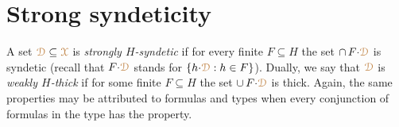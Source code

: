 \begin{comment}

\begin{corollary}
  Let $G=\Aut(\U/A)$.
  Let $\mrX=p(\U^{\mr x})$ where $p({\mr x})$ is a complete $\GDelta(A)$-type.
  Then for every $\BDelta(\grZ)$-definable set $\mrD$ that intersects $\mrX$ the following are equivalent
  \begin{itemize}
    \item [1.]  $\mrC\subseteq\mrD$ for some $\mrC\in\acl^\eq\!A$ that intersects $\mrX$
    \item [2.]  $\mrD$ is $G$-syndetic.
  \end{itemize}
\end{corollary}

\begin{proof}
  \ssf1$\IMP$\ssf2.
  Pick any ${\mr a}\in\mrC\cap\mrX$.
  We can assume that $\mrC=\epsilon(\U^{\mr x}\,;{\mr a})$ is an equivalence class of some finite equivalence relation $\epsilon({\mr x}\,;{\mr y})\in L(A)$ 
  As $G$ acts transitively on $\mrX$ the orbit of $\mrC$ coves $\mrX$.
  Therefore $\mrC\subseteq\mrD$, and a fortiori $\mrD$, is $G$-syndetic.

  \ssf2$\IMP$\ssf1.
  Let $Q_G$ be as in Lemma~\ref{lem_trans_action}.
  Pick any $q({\mr x})\in Q_G$.
  By syndeticity $q({\mr x})\proves{\mr x}\in g{\cdot}\mrD$ for some $g\in G$.
  Then $g^{-1}\!\cdot q({\mr x})\proves{\mr x}\in \mrD$.
  Pick any ${\mr a}\models g^{-1}\!\cdot q({\mr x})$.
  As $g^{-1}\!\cdot q({\mr x})\in Q_G$, by the second claim in the lemma and compactness,  $\epsilon(\U^{\mr x}\,;{\mr a})\subseteq\mrD$ for some finite equivalence relation $\epsilon({\mr x}\,;{\mr y})\in\GDelta(A)$.
\end{proof}
\end{comment}

\section{Strong syndeticity}\label{strong_syndeticity}


A set ${\color{brown}\EuScript D}\subseteq{\color{brown}\EuScript X}$ is \emph{strongly $H$-syndetic\/} if for every finite $F\subseteq H$ the set $\cap\,F{\cdot}{\color{brown}\EuScript D}$ is syndetic (recall that $F{\cdot}{\color{brown}\EuScript D}$ stands for $\{h{\cdot}{\color{brown}\EuScript D}: h\in F\}$).
Dually, we say that ${\color{brown}\EuScript D}$ is \emph{weakly $H$-thick\/} if for some finite $F\subseteq H$ the set $\cup\,F{\cdot}{\color{brown}\EuScript D}$ is thick.
Again, the same properties may be attributed to formulas and types when every conjunction of formulas in the type has the property.

